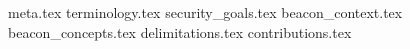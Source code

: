 {meta.tex}
{terminology.tex}
{security_goals.tex}
{beacon_context.tex}
{beacon_concepts.tex}
{delimitations.tex}
{contributions.tex}
